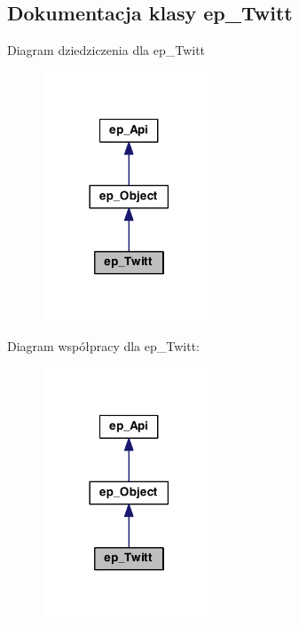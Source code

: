 \hypertarget{classep___twitt}{\subsection{Dokumentacja klasy ep\-\_\-\-Twitt}
\label{classep___twitt}
}


Diagram dziedziczenia dla ep\-\_\-\-Twitt\nopagebreak
\begin{figure}[H]
\begin{center}
\leavevmode
\includegraphics[width=146pt]{classep___twitt__inherit__graph}
\end{center}
\end{figure}


Diagram współpracy dla ep\-\_\-\-Twitt\-:\nopagebreak
\begin{figure}[H]
\begin{center}
\leavevmode
\includegraphics[width=146pt]{classep___twitt__coll__graph}
\end{center}
\end{figure}
